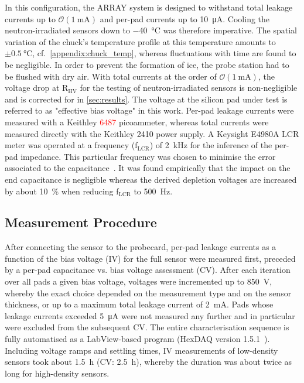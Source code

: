 In this configuration, the ARRAY system is designed to withstand total leakage currents up to $\mathcal{O}(\SI{1}{\milli\ampere})$ and per-pad currents up to \SI{10}{\micro\ampere}.
Cooling the neutron-irradiated sensors down to \SI{-40}{\celsius} was therefore imperative.
The spatial variation of the chuck's temperature profile at this temperature amounts to $\pm\SI{0.5}{\celsius}$, cf.~\ref{appendix:chuck_temp}, whereas fluctuations with time are found to be negligible. 
In order to prevent the formation of ice, the probe station had to be flushed with dry air. 
With total currents at the order of $\mathcal{O}(\SI{1}{\milli\ampere})$, the voltage drop at R$_\text{HV}$ for the testing of neutron-irradiated sensors is non-negligible and is corrected for in \ref{sec:results}.
The voltage at the silicon pad under test is referred to as "effective bias voltage" in this work.
Per-pad leakage currents were measured with a Keithley \textcolor{red}{6487} picoammeter, whereas total currents were measured directly with the Keithley 2410 power supply.
A Keysight E4980A LCR meter was operated at a frequency (f$_\text{LCR}$) of \SI{2}{\kilo\hertz} for the inference of the per-pad impedance.
This particular frequency was chosen to minimise the error associated to the capacitance~\cite{pitters:array2019}.
It was found empirically that the impact on the end capacitance is negligible whereas the derived depletion voltages are increased by about \SI{10}{\percent} when reducing f$_\text{LCR}$ to \SI{500}{\hertz}. 

\subsection{Measurement Procedure}
\label{subsec:setup_procedure}
After connecting the sensor to the probecard, per-pad leakage currents as a function of the bias voltage (IV) for the full sensor were measured first, preceded by a per-pad capacitance vs. bias voltage assessment (CV).
After each iteration over all pads a given bias voltage, voltages were incremented up to \SI{850}{\volt}, whereby the exact choice depended on the measurement type and on the sensor thickness, or up to a maximum total leakage current of \SI{2}{\milli\ampere}.  
Pads whose leakage currents exceeded \SI{5}{\micro\ampere} were not measured any further and in particular were excluded from the subsequent CV.
The entire characterisation sequence is fully automatised as a LabView-based program (HexDAQ version 1.5.1~\cite{labview_hexdaq}).
Including voltage ramps and settling times, IV measurements of low-density sensors took about \SI{1.5}{\hour} (CV: \SI{2.5}{\hour}), whereby the duration was about twice as long for high-density sensors.